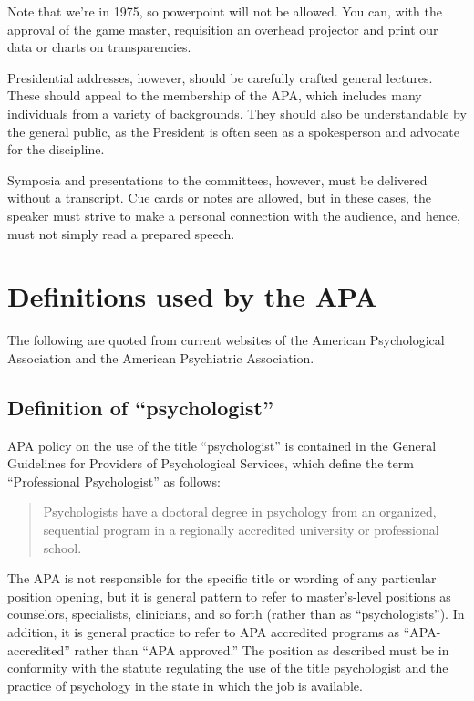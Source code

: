 \begin{refsection}
Note that we’re in 1975, so powerpoint will not be allowed. You can, with the approval of the game master, requisition an overhead projector and print our data or charts on transparencies.

Presidential addresses, however, should be carefully crafted general lectures. These should appeal to the membership of the APA, which includes many individuals from a variety of backgrounds. They should also be understandable by the general public, as the President is often seen as a spokesperson and advocate for the discipline.

Symposia and presentations to the committees, however, must be delivered without a transcript. Cue cards or notes are allowed, but in these cases, the speaker must strive to make a personal connection with the audience, and hence, must not simply read a prepared speech.

\section{Definitions used by the APA}
\label{definitionsusedbytheapa}

The following are quoted from current websites of the American Psychological Association and the American Psychiatric Association.

\subsection{Definition of ``psychologist''}
\label{definitionofpsychologist}

APA policy on the use of the title ``psychologist'' is contained in the General Guidelines for Providers of Psychological Services, which define the term ``Professional Psychologist'' as follows:

\begin{quote}

Psychologists have a doctoral degree in psychology from an organized, sequential program in a regionally accredited university or professional school.
\end{quote}

The APA is not responsible for the specific title or wording of any particular position opening, but it is general pattern to refer to master's-level positions as counselors, specialists, clinicians, and so forth (rather than as ``psychologists''). In addition, it is general practice to refer to APA accredited programs as ``APA-accredited'' rather than ``APA approved.'' The position as described must be in conformity with the statute regulating the use of the title psychologist and the practice of psychology in the state in which the job is available.


\end{refsection}
